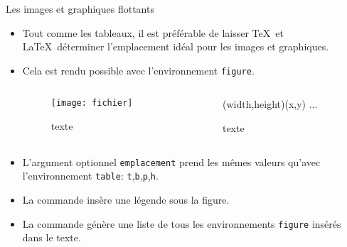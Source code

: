 \begin{frame}[fragile,c]{Les images et graphiques flottants}
	\begin{itemize}
		\item Tout comme les tableaux, il est préférable de laisser \TeX\ et \LaTeX\ déterminer
			l'emplacement idéal pour les images et graphiques.
		\item Cela est rendu possible avec l'environnement \texttt{figure}.
		\vspace{-2.2mm}
		\begin{columns}
			\begin{column}{.4\textwidth}
\begin{codesource}
	\begin{figure}[emplacement]
		\texttt{[image: fichier]}
		\caption{texte}
	\end{figure}
\end{codesource}
			\end{column}
			\begin{column}{.4\textwidth}
\begin{codesource}
	\begin{figure}[emplacement]
		\begin{picture}(width,height)(x,y)
			...
		\end{picture}
		\caption{texte}
	\end{figure}
\end{codesource}
			\end{column}
		\end{columns}
	
		\pause
		\item L'argument optionnel \texttt{emplacement} prend les mêmes valeurs qu'avec l'environnement \texttt{table}: \texttt{t},\texttt{b},\texttt{p},\texttt{h}.
		\item La commande  insère une légende sous la figure.
		\item La commande  génère une liste de tous les environnements \texttt{figure} insérés dans le texte.
	\end{itemize}
\end{frame}